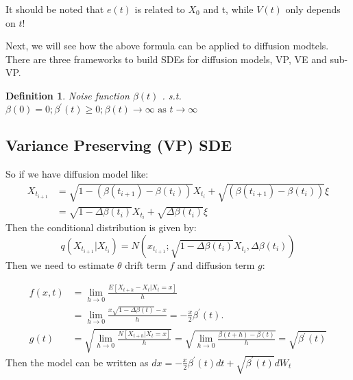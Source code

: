 \documentclass{article}
\newtheorem{definition}{Definition}
\begin{document}
It should be noted that $e(t)$ is related to $X_0$ and t, while $V(t)$ only depends on $t$!

Next, we will see how the above formula can be applied to diffusion modtels. There are three frameworks to build SDEs for diffusion models, VP, VE and sub-VP.
\begin{definition}
    Noise function  $\beta(t)$ . s.t. $\beta(0)=0 ; \beta^{\prime}(t) \geqslant 0 ; \beta(t) \rightarrow \infty \text { as } t \rightarrow \infty$
\end{definition}

\subsection{Variance Preserving (VP) SDE}
So if we have diffusion model like:
\begin{equation}
\begin{aligned}
    X_{t_{i+1}}&=\sqrt{1-\left(\beta\left(t_{i+1}\right)-\beta\left(t_{i}\right)\right)}X_{t_i}+\sqrt{\left(\beta\left(t_{i+1}\right)-\beta\left(t_{i}\right)\right)}\xi\\
    &=\sqrt{1-\Delta\beta(t_i)}X_{t_i}+\sqrt{\Delta \beta(t_i)}\xi
\end{aligned}
\end{equation}
Then the conditional distribution is given by:
\begin{equation}
    q\left(X_{t_{i+1}} | X_{t_{i}}\right)=N(x_{t_{i+1}} ; \sqrt{1-\Delta \beta\left(t_{i}\right)}X_{t_i}, \Delta \beta\left(t_{i}\right))
\end{equation}
Then we need to estimate  $\theta$  drift term  $f$  and diffusion term  $g$:

\begin{equation}
    \begin{aligned}
        f(x, t)&=\lim _{h \rightarrow 0} \frac{E\left[X_{t+h}-X_{t} | X_{t}=x\right]}{h} \\
            &=\lim _{h \rightarrow 0} \frac{x \sqrt{1-\Delta \beta(t)}-x}{h}=-\frac{x}{2} \beta^{\prime}(t) . \\
    g(t) &= \sqrt{\lim _{h \rightarrow 0} \frac{N\left[X_{t+h} | X_{t}=x\right]}{h}}=\sqrt{\lim _{h \rightarrow 0} \frac{\beta(t+h)-\beta(t)}{h}}=\sqrt{\beta^{\prime}(t)}
    \end{aligned}
\end{equation}
Then the model can be written as
$d x=-\frac{x}{2} \beta^{\prime}(t) d t+\sqrt{\beta^{\prime}(t)} d W_{t}$
\end{document}
